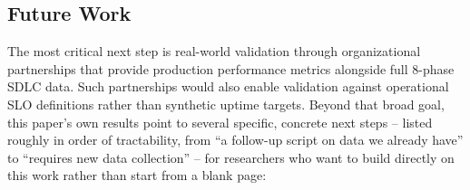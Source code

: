 \documentclass[technologies,article,submit,pdftex,moreauthors]{Definitions/mdpi}
\begin{document}
\subsection{Future Work}\label{sec:future_work}

The most critical next step is real-world validation through
organizational partnerships that provide production performance metrics
alongside full 8-phase SDLC data. Such partnerships would also enable
validation against operational SLO definitions rather than synthetic
uptime targets. Beyond that broad goal, this paper's own results point
to several specific, concrete next steps -- listed roughly in order of
tractability, from ``a follow-up script on data we already have'' to
``requires new data collection'' -- for researchers who want to build
directly on this work rather than start from a blank page:
\end{document}
